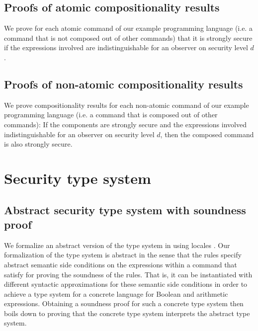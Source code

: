 \documentclass[11pt,a4paper]{article}
\begin{document}


\subsection{Proofs of atomic compositionality results}

We prove for each atomic command of our example programming language
(i.e. a command that is not composed out of other commands) that it is
strongly secure if the expressions involved are indistinguishable for
an observer on security level $d$.



\subsection{Proofs of non-atomic compositionality results}

We prove compositionality results for each non-atomic command of our
example programming language (i.e. a command that is composed out
of other commands): If the components are strongly secure and the
expressions involved indistinguishable for an observer on security
level $d$, then the composed command is also strongly secure.



\section{Security type system}

\subsection{Abstract security type system with soundness proof}

We formalize an abstract version of the type system in
\cite{sabelfeld2000probabilistic} using locales
\cite{conf/types/Ballarin03}. Our formalization of the type system is
abstract in the sense that the rules specify abstract semantic side
conditions on the expressions within a command that satisfy for
proving the soundness of the rules. That is, it can be instantiated
with different syntactic approximations for these semantic side
conditions in order to achieve a type system for a concrete language
for Boolean and arithmetic expressions. Obtaining a soundness proof
for such a concrete type system then boils down to proving that the
concrete type system interprets the abstract type system.
\end{document}
